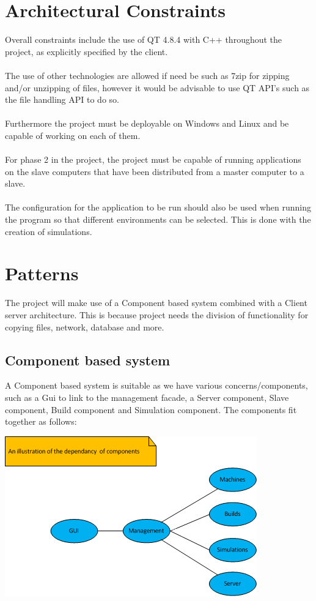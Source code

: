 \documentclass[a4paper,12pt,final]{article}
\begin{document}
\section{Architectural Constraints}
Overall constraints include the use of QT 4.8.4 with C++ throughout the project, as explicitly specified by the client.\\\textbf{\\}
The use of other technologies are allowed if need be such as 7zip for zipping and/or unzipping of files, however it would be advisable to use QT API's such as the file handling API to do so.\\\textbf{\\}
Furthermore the project must be deployable on Windows and Linux and be capable of working on each of them.\\\textbf{\\}
For phase 2 in the project, the project must be capable of running applications on the slave computers that have been distributed from a master computer to a slave.\\\textbf{\\}
The configuration for the application to be run should also be used when running the program so that different environments can be selected. This is done with the creation of simulations.

\section{Patterns}
The project will make use of a Component based system combined with a Client server architecture. This is because project needs the division of functionality for copying files, network, database and more.
\subsection{Component based system}
A Component based system is suitable as we have various concerns/components, such as a Gui to link to the management facade, a Server component, Slave component, Build component and Simulation component. The components fit together as follows:
\begin{center}
  \includegraphics[scale=1]{ArchComponentDiag.png}
\end{center}
\end{document}
